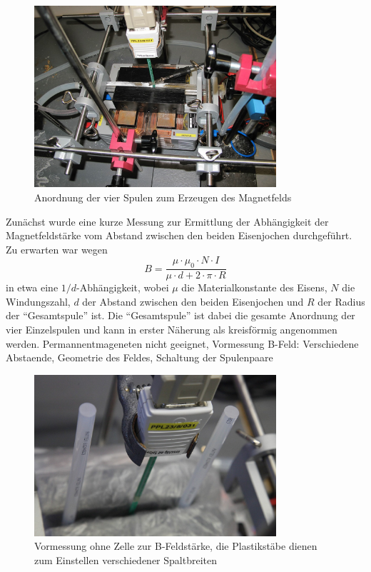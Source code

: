 \documentclass[11pt]{scrartcl}
\begin{document}
\begin{figure}[ht]
\begin{center}
\includegraphics[width=0.8\textwidth]{images/bfeld-vor2.jpg}
\end{center}
\vspace{-1.5\baselineskip}
\caption{Anordnung der vier Spulen zum Erzeugen des Magnetfelds}
\label{bfeld-vor2}
\end{figure}

Zunächst wurde eine kurze Messung zur Ermittlung der Abhängigkeit der Magnetfeldstärke vom Abstand zwischen den beiden Eisenjochen
durchgeführt. Zu erwarten war wegen 
\begin{equation*}
B = \frac{\mu \cdot \mu_{0} \cdot N \cdot I}{\mu \cdot d + 2 \cdot \pi \cdot R}
\end{equation*}
in etwa eine $1/d$-Abhängigkeit, wobei $\mu$ die Materialkonstante des Eisens, $N$ die Windungszahl, $d$ der Abstand zwischen den beiden Eisenjochen und $R$ der Radius der "`Gesamtspule"' ist. Die "`Gesamtspule"' ist dabei die gesamte Anordnung der vier Einzelspulen und kann in erster Näherung als kreisförmig angenommen werden.
Permannentmageneten nicht geeignet, Vormessung B-Feld: Verschiedene Abstaende, Geometrie des Feldes, Schaltung der Spulenpaare

\begin{figure}[ht]
\begin{center}
\includegraphics[width=0.8\textwidth]{images/bfeld-vor1.jpg}
\end{center}
\vspace{-1.5\baselineskip}
\caption{Vormessung ohne Zelle zur B-Feldst\"arke, die Plastikst\"abe dienen zum Einstellen verschiedener Spaltbreiten}
\label{bfeld-vor1}
\end{figure}
\end{document}
